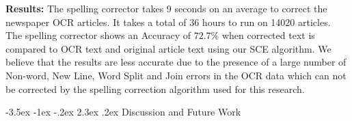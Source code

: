 \documentclass[12pt]{article}
\makeatletter
\renewcommand\section{\@startsection{section}{1}{\z@}%
                                  {-3.5ex \@plus -1ex \@minus -.2ex}%
                                  {2.3ex \@plus.2ex}%
                                  {\normalfont\bfseries}}
\makeatother
\begin{document}

\noindent \textbf{Results: }
The spelling corrector takes 9 seconds on an average to correct the newspaper OCR articles. It takes a total of 36 hours to run on 14020 articles.
The spelling corrector shows an Accuracy of $72.7 \%$  when corrected text is compared to OCR text and original article text using our SCE algorithm. We believe that the results are less accurate due to the presence of a large number of Non-word, New Line, Word Split and Join errors in the OCR data which can not be corrected by the spelling correction algorithm used for this research.









\section{Discussion and Future Work}
\label{spell:discussion}
\end{document}
